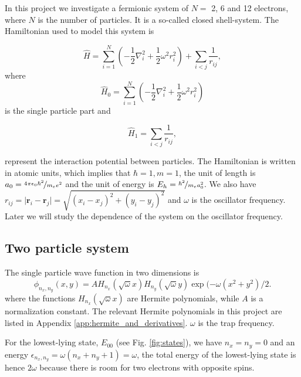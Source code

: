 In this project we investigate a fermionic system of $N=$ 2, 6 and 12 electrons, where $N$ is the number of particles. It is a so-called closed shell-system. The Hamiltonian used to model this system is

\begin{equation}
\label{eq:finalH}
\hat{H}=\sum_{i=1}^{N} \left(  -\frac{1}{2} \nabla_i^2 + \frac{1}{2} \omega^2r_i^2  \right)+\sum_{i<j}\frac{1}{r_{ij}},
\end{equation}
where 
$$\hat{H}_0=\sum_{i=1}^{N} \left(  -\frac{1}{2} \nabla_i^2 + \frac{1}{2} \omega^2r_i^2  \right)$$
is the single particle part and

\begin{equation}\label{eq:hamilton_interaction}
\hat{H}_1=\sum_{i<j}\frac{1}{r_{ij}},
\end{equation}

represent the interaction potential between particles. The Hamiltonian is written in atomic units, which implies that $\hbar = 1, m= 1$, the unit of length is $a_0 = \nicefrac{4 \pi \epsilon_0 \hbar^2}{m_e e^2}$ and the unit of energy is $E_h = \nicefrac{\hbar^2}{m_e a_0^2}$.  We also have $r_{ij}=\vert \bm{r}_i-\bm{r}_j\vert= \sqrt{(x_i-x_j)^2 + (y_i-y_j)^2}$ and $\omega$ is the oscillator frequency. Later we will study the dependence of the system on the oscillator frequency. 

\subsection{Two particle system}

The single particle wave function in two dimensions is
\begin{equation}\label{eq:single_particle_wf}
\phi_{n_x,n_y}(x,y) = A H_{n_x}(\sqrt{\omega}x)H_{n_y}(\sqrt{\omega}y)\exp{(-\omega(x^2+y^2)/2}.
\end{equation}
where the functions $H_{n_x}(\sqrt{\omega}x)$ are Hermite polynomials,  while $A$ is a normalization constant. The relevant Hermite polynomials in this project are listed in Appendix \ref{app:hermite_and_derivatives}. $\omega$ is the trap frequency.

For the lowest-lying state, $E_{00}$  (see Fig. \ref{fig:states}), we have $n_x=n_y=0$ and an energy $\epsilon_{n_x,n_y}=\omega(n_x+n_y+1) = \omega$, the total energy of the lowest-lying state is hence $2\omega$ because there is room for two electrons with opposite spins. 

